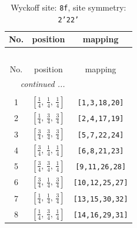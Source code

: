 \documentclass[fleqn,8pt]{jsarticle}
\begin{document}
\begin{longtable}{ccc}
\caption{Wyckoff site: {\tt 8f}, site symmetry: {\tt 2'22'}}
 \\
 \hline \hline
No. & position & mapping \\ \hline \endfirsthead

\multicolumn{2}{l}{\tablename\ \thetable{}} \\
 \hline \hline
No. & position & mapping \\ \hline \endhead

 \hline \hline
\multicolumn{2}{r}{\footnotesize\it continued ...} \\ \endfoot

 \hline \hline
\multicolumn{2}{r}{} \\ \endlastfoot

1 & $\left[ \frac{1}{4},\, \frac{1}{4},\, \frac{1}{4} \right]$ & {\tt [1,3,18,20]} \\ \hline
2 & $\left[ \frac{1}{4},\, \frac{3}{4},\, \frac{3}{4} \right]$ & {\tt [2,4,17,19]} \\ \hline
3 & $\left[ \frac{3}{4},\, \frac{3}{4},\, \frac{3}{4} \right]$ & {\tt [5,7,22,24]} \\ \hline
4 & $\left[ \frac{3}{4},\, \frac{1}{4},\, \frac{1}{4} \right]$ & {\tt [6,8,21,23]} \\ \hline
5 & $\left[ \frac{3}{4},\, \frac{3}{4},\, \frac{1}{4} \right]$ & {\tt [9,11,26,28]} \\ \hline
6 & $\left[ \frac{3}{4},\, \frac{1}{4},\, \frac{3}{4} \right]$ & {\tt [10,12,25,27]} \\ \hline
7 & $\left[ \frac{1}{4},\, \frac{1}{4},\, \frac{3}{4} \right]$ & {\tt [13,15,30,32]} \\ \hline
8 & $\left[ \frac{1}{4},\, \frac{3}{4},\, \frac{1}{4} \right]$ & {\tt [14,16,29,31]} \\
\end{longtable}
\renewcommand{\arraystretch}{1.2}
\end{document}
